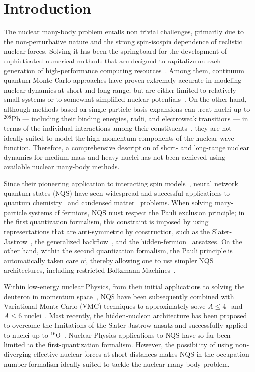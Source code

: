 \documentclass[aps,pre,floatfix,showpacs,twocolumn, preprintnumbers]{revtex4-1}
\begin{document}
\section{Introduction}
The nuclear many-body problem entails non trivial challenges, primarily due to the non-perturbative nature and the strong spin-isospin dependence of realistic nuclear forces. Solving it has been the springboard for the development of sophisticated numerical methods that are designed to capitalize on each generation of high-performance computing resources~\cite{Hagen:2013nca,Hergert:2015awm,Soma:2020xhv,Lee:2020meg}. Among them, continuum quantum Monte Carlo approaches have proven extremely accurate in modeling nuclear dynamics at short and long range, but are either limited to relatively small systems or to somewhat simplified nuclear potentials~\cite{Carlson:2014vla}. On the other hand, although methods based on single-particle basis expansions can treat nuclei up to $^{208}$Pb --- including their binding energies, radii, and electroweak transitions --- in terms of the individual interactions among their constituents~\cite{Gysbers:2019uyb,Malbrunot-Ettenauer:2021fnr,Hu:2021trw}, they are not ideally suited to model the high-momentum components of the nuclear wave function. Therefore, a comprehensive description of short- and long-range nuclear dynamics for medium-mass and heavy nuclei has not been achieved using available nuclear many-body methods. 

Since their pioneering application to interacting spin models~\cite{Carleo:2017}, neural network quantum states (NQS) have seen widespread and successful applications to quantum chemistry~\cite{Choo:2019,Hermann:2019,Pfau:2019} and condensed matter~\cite{Pescia:2021kxb,Wilson:2022meh} problems. When solving many-particle systems of fermions, NQS must respect the Pauli exclusion principle; in the first quantization formalism, this constraint is imposed by using representations that are anti-symmetric by construction, such as the Slater-Jastrow~\cite{Stokes:2020ihf}, the generalized backflow~\cite{Hermann:2019,Pfau:2019}, and the hidden-fermion~\cite{Moreno:2021jas} ansatzes. On the other hand, within the second quantization formalism, the Pauli principle is automatically taken care of, thereby allowing one to use simpler NQS architectures, including restricted Boltzmann Machines~\cite{Choo:2019,Zhao:2022}. 

Within low-energy nuclear Physics, from their initial applications to solving the deuteron in momentum space~\cite{Keeble:2019bkv,Sarmiento:2022bxn}, NQS have been subsequently combined with Variational Monte Carlo (VMC) techniques to approximately solve $A\leq 4$~\cite{Adams:2020aax} and $A\leq 6$ nuclei~\cite{Gnech:2021wfn}. Most recently, the hidden-nucleon architecture has been proposed to overcome the limitations of the Slater-Jastrow ansatz and successfully applied to nuclei up to $^{16}$O~\cite{Lovato:2022tjh}. Nuclear Physics applications to NQS have so far been limited to the first-quantization formalism. However, the possibility of using non-diverging effective nuclear forces at short distances makes NQS in the occupation-number formalism ideally suited to tackle the nuclear many-body problem. 
\end{document}
